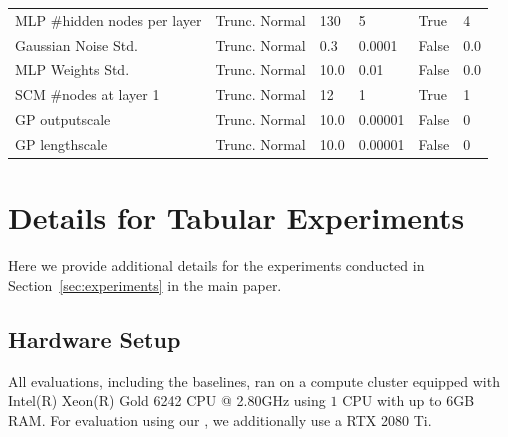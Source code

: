 \documentclass{article}
\begin{document}
\begin{table}[]
\begin{tabular}{llllll}
    MLP \#hidden nodes per layer &      Trunc. Normal &      130 &        5 &        True &           4 \\
    Gaussian Noise Std.          &      Trunc. Normal &      0.3 &   0.0001 &       False &         0.0 \\
    MLP Weights Std.             &      Trunc. Normal &     10.0 &     0.01 &       False &         0.0 \\
    SCM \#nodes at layer 1        &      Trunc. Normal &       12 &        1 &        True &           1 \\
    GP outputscale               &      Trunc. Normal &     10.0 &  0.00001 &       False &           0 \\
    GP lengthscale               &      Trunc. Normal &     10.0 &  0.00001 &       False &           0 \\
    \bottomrule
    \end{tabular}
    \label{tab:diffable_hps}
\end{table}


\section{Details for Tabular Experiments}\label{app:expdetails}

Here we provide additional details for the experiments conducted in Section~\ref{sec:experiments} in the main paper. 

\subsection{Hardware Setup} \label{app:ssec:hardware}
All evaluations, including the baselines, ran on a compute cluster equipped with Intel(R) Xeon(R) Gold 6242 CPU @ 2.80GHz using $1$ CPU with up to $6$GB RAM. For evaluation using our \methodname{}, we additionally use a RTX 2080 Ti.

\end{document}
